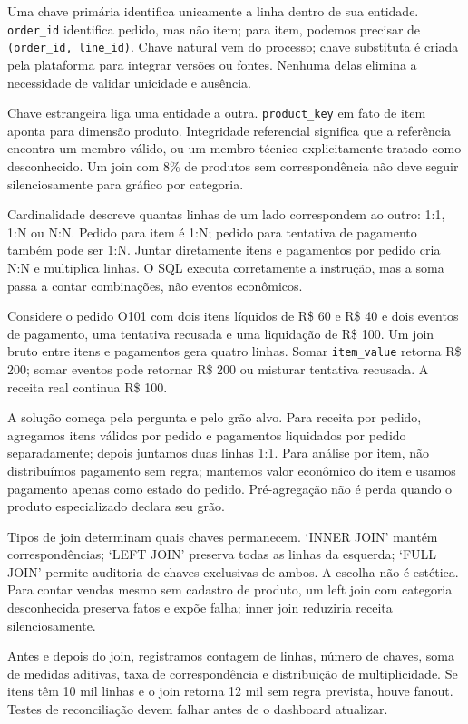 Uma chave primária identifica unicamente a linha dentro de sua entidade. \texttt{order\_id} identifica pedido, mas não item; para item, podemos precisar de \texttt{(order\_id, line\_id)}. Chave natural vem do processo; chave substituta é criada pela plataforma para integrar versões ou fontes. Nenhuma delas elimina a necessidade de validar unicidade e ausência.

Chave estrangeira liga uma entidade a outra. \texttt{product\_key} em fato de item aponta para dimensão produto. Integridade referencial significa que a referência encontra um membro válido, ou um membro técnico explicitamente tratado como desconhecido. Um join com 8\% de produtos sem correspondência não deve seguir silenciosamente para gráfico por categoria.

Cardinalidade descreve quantas linhas de um lado correspondem ao outro: 1:1, 1:N ou N:N. Pedido para item é 1:N; pedido para tentativa de pagamento também pode ser 1:N. Juntar diretamente itens e pagamentos por pedido cria N:N e multiplica linhas. O SQL executa corretamente a instrução, mas a soma passa a contar combinações, não eventos econômicos.

Considere o pedido O101 com dois itens líquidos de R\$ 60 e R\$ 40 e dois eventos de pagamento, uma tentativa recusada e uma liquidação de R\$ 100. Um join bruto entre itens e pagamentos gera quatro linhas. Somar \texttt{item\_value} retorna R\$ 200; somar eventos pode retornar R\$ 200 ou misturar tentativa recusada. A receita real continua R\$ 100.

A solução começa pela pergunta e pelo grão alvo. Para receita por pedido, agregamos itens válidos por pedido e pagamentos liquidados por pedido separadamente; depois juntamos duas linhas 1:1. Para análise por item, não distribuímos pagamento sem regra; mantemos valor econômico do item e usamos pagamento apenas como estado do pedido. Pré-agregação não é perda quando o produto especializado declara seu grão.

Tipos de join determinam quais chaves permanecem. `INNER JOIN' mantém correspondências; `LEFT JOIN' preserva todas as linhas da esquerda; `FULL JOIN' permite auditoria de chaves exclusivas de ambos. A escolha não é estética. Para contar vendas mesmo sem cadastro de produto, um left join com categoria desconhecida preserva fatos e expõe falha; inner join reduziria receita silenciosamente.

Antes e depois do join, registramos contagem de linhas, número de chaves, soma de medidas aditivas, taxa de correspondência e distribuição de multiplicidade. Se itens têm 10 mil linhas e o join retorna 12 mil sem regra prevista, houve fanout. Testes de reconciliação devem falhar antes de o dashboard atualizar.

